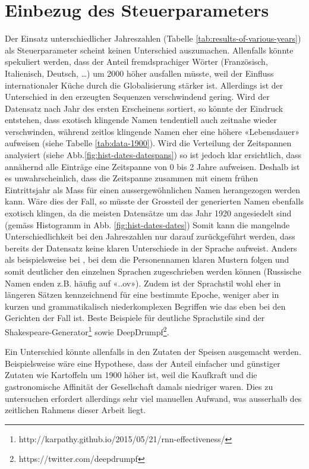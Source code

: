 \section{Einbezug des Steuerparameters}
\label{sec:including-years}

Der Einsatz unterschiedlicher Jahreszahlen (Tabelle \ref{tab:results-of-various-years}) als Steuerparameter scheint keinen Unterschied auszumachen.
Allenfalls könnte spekuliert werden, dass der Anteil fremdsprachiger Wörter (Französisch, Italienisch, Deutsch, …) um 2000 höher ausfallen müsste,
weil der Einfluss internationaler Küche durch die Globalisierung stärker ist.
Allerdings ist der Unterschied in den erzeugten Sequenzen verschwindend gering.
Wird der Datensatz nach Jahr des ersten Erscheinens sortiert, so könnte der Eindruck entstehen,
dass exotisch klingende Namen tendentiell auch zeitnahe wieder verschwinden, während zeitlos klingende
Namen eher eine höhere «Lebensdauer» aufweisen (siehe Tabelle \ref{tab:data-1900}).
Wird die Verteilung der Zeitspannen analysiert (siehe Abb.\ref{fig:hist-dates-datespans}) so ist jedoch klar ersichtlich,
dass annähernd alle Einträge eine Zeitspanne von 0 bis 2 Jahre aufweisen.
Deshalb ist es unwahrscheinlich, dass die Zeitspanne zusammen mit einem frühen Eintrittsjahr als Mass für einen
aussergewöhnlichen Namen herangezogen werden kann.
Wäre dies der Fall, so müsste der Grossteil der generierten Namen ebenfalls exotisch klingen, da die meisten Datensätze
um das Jahr 1920 angesiedelt sind (gemäss Histogramm in Abb. \ref{fig:hist-dates-dates})
Somit kann die mangelnde Unterschiedlichkeit bei den Jahreszahlen nur darauf zurückgeführt werden, dass bereits
der Datensatz keine klaren Unterschiede in der Sprache aufweist.
Anders als beispielsweise bei \autocite{robertson}, bei dem die Personennamen klaren Mustern folgen und somit deutlicher
den einzelnen Sprachen zugeschrieben werden können (Russische Namen enden z.B. häufig auf «..ov»).
Zudem ist der Sprachstil wohl eher in längeren Sätzen kennzeichnend für eine bestimmte Epoche, weniger aber in kurzen und
grammatikalisch niederkomplexen Begriffen wie das eben bei den Gerichten der Fall ist.
Beste Beispiele für deutliche Sprachstile sind der Shakespeare-Generator\footnote{http://karpathy.github.io/2015/05/21/rnn-effectiveness/} sowie DeepDrumpf\footnote{https://twitter.com/deepdrumpf}.

Ein Unterschied könnte allenfalls in den Zutaten der Speisen ausgemacht werden.
Beispielsweise wäre eine Hypothese, dass der Anteil einfacher und günstiger Zutaten wie Kartoffeln um 1900 höher ist, weil
die Kaufkraft und die gastronomische Affinität der Gesellschaft damals niedriger waren.
Dies zu untersuchen erfordert allerdings sehr viel manuellen Aufwand, was ausserhalb des zeitlichen Rahmens dieser Arbeit liegt.

